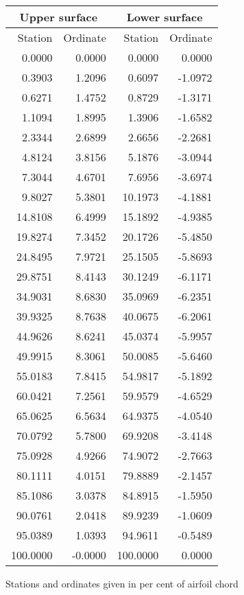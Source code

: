 \documentclass[11pt]{book}
\begin{document}
 \hspace{4mm}
 \begin{tabular}{|r|r|r|r|} \hline 
 \multicolumn{2}{|c|}{Upper surface} & \multicolumn{2}{|c|}{Lower surface} \\
 \hline
 Station & Ordinate & Station & Ordinate \\
 \hline
0.0000 & 0.0000 & 0.0000 & 0.0000 \\
0.3903 & 1.2096 & 0.6097 & -1.0972 \\
0.6271 & 1.4752 & 0.8729 & -1.3171 \\
1.1094 & 1.8995 & 1.3906 & -1.6582 \\
2.3344 & 2.6899 & 2.6656 & -2.2681 \\
4.8124 & 3.8156 & 5.1876 & -3.0944 \\
7.3044 & 4.6701 & 7.6956 & -3.6974 \\
9.8027 & 5.3801 & 10.1973 & -4.1881 \\
14.8108 & 6.4999 & 15.1892 & -4.9385 \\
19.8274 & 7.3452 & 20.1726 & -5.4850 \\
24.8495 & 7.9721 & 25.1505 & -5.8693 \\
29.8751 & 8.4143 & 30.1249 & -6.1171 \\
34.9031 & 8.6830 & 35.0969 & -6.2351 \\
39.9325 & 8.7638 & 40.0675 & -6.2061 \\
44.9626 & 8.6241 & 45.0374 & -5.9957 \\
49.9915 & 8.3061 & 50.0085 & -5.6460 \\
55.0183 & 7.8415 & 54.9817 & -5.1892 \\
60.0421 & 7.2561 & 59.9579 & -4.6529 \\
65.0625 & 6.5634 & 64.9375 & -4.0540 \\
70.0792 & 5.7800 & 69.9208 & -3.4148 \\
75.0928 & 4.9266 & 74.9072 & -2.7663 \\
80.1111 & 4.0151 & 79.8889 & -2.1457 \\
85.1086 & 3.0378 & 84.8915 & -1.5950 \\
90.0761 & 2.0418 & 89.9239 & -1.0609 \\
95.0389 & 1.0393 & 94.9611 & -0.5489 \\
100.0000 & -0.0000 & 100.0000 & 0.0000 \\
 \hline 
 \end{tabular}
 \vspace{8mm}

Stations and ordinates given in per cent of airfoil chord
\end{document}
